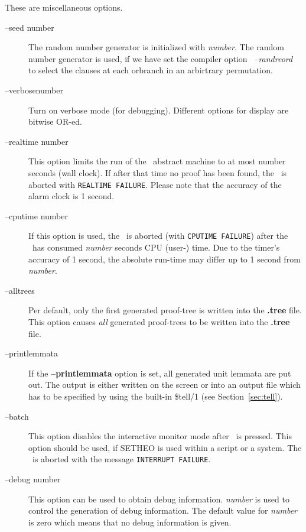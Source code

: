 These are miscellaneous options.
\begin{description}
      \item[--seed number] 
           {The  random  number  generator  is   initialized   with
            {\it number\/}.  The random number generator is used, if  we
            have  set  the compiler option \inw\ {\it --randreord\/} to
            select the clauses at each orbranch in an arbirtrary
            permutation.} 
      \item[--v\lb erbose\rb \lb number\rb] 
           {Turn  on  verbose  mode  (for  debugging).    Different
            options for display are bitwise OR-ed.}
      \item[--realtime number] 
           {This option limits the run of the \SAM\ abstract machine to
                at most {\rm number\/} seconds (wall clock). If after that
                time no proof has been found, the \SAM\ is aborted with
                {\tt REALTIME FAILURE}. Please note that the accuracy of the
                alarm clock is 1 second.}
      \item[--cputime number] 
           {If this option is used, the \SAM\ is aborted (with
                {\tt CPUTIME FAILURE}) after the \SAM\ has consumed
                {\em number\/} seconds CPU (user-) time. Due to
                the timer's accuracy of 1 second, the absolute run-time
                may differ up to 1 second from {\em number}.}
      \item[--alltrees]
           Per default, only the first generated proof-tree is written
           into the {\bf .tree} file. This option causes {\it all\/}
           generated proof-trees to be written into the {\bf .tree}
           file. 
      \item[--printlemmata]
           If the {\bf --printlemmata} option is set, all generated
           unit lemmata are put out. The output is either written on the
           screen or into an output file which has to be specified by
           using the built-in \$tell/1 (see Section~\ref{sec:tell}).
      \item[--batch] 
           {This option disables the interactive monitor mode after
                \Cc\ is pressed. This option should be used, if
                SETHEO is used within a script or a system. The \SAM\ is
                aborted with the message {\tt INTERRUPT FAILURE}.}
      \item[--debug number] 
           This option can be used to obtain debug information. {\it
           number\/} is used to control the generation of debug
           information. The default value for {\it number\/} is zero
           which means that no debug information is given.
\end{description}


